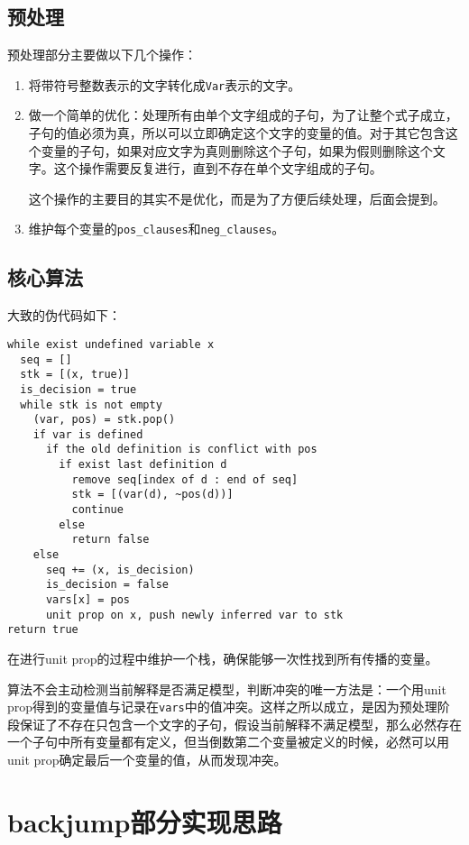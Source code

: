 \documentclass[12pt, UTF8]{article}
\begin{document}
\subsection{预处理}

预处理部分主要做以下几个操作：

\begin{enumerate}
  \item
    将带符号整数表示的文字转化成\lstinline|Var|表示的文字。
  \item
    做一个简单的优化：处理所有由单个文字组成的子句，为了让整个式子成立，子句的值必须为真，所以可以立即确定这个文字的变量的值。对于其它包含这个变量的子句，如果对应文字为真则删除这个子句，如果为假则删除这个文字。这个操作需要反复进行，直到不存在单个文字组成的子句。
    
    这个操作的主要目的其实不是优化，而是为了方便后续处理，后面会提到。
  \item
    维护每个变量的\lstinline|pos_clauses|和\lstinline|neg_clauses|。
\end{enumerate}

\subsection{核心算法}

大致的伪代码如下：

\begin{lstlisting}
while exist undefined variable x
  seq = []
  stk = [(x, true)]
  is_decision = true
  while stk is not empty
    (var, pos) = stk.pop()
    if var is defined
      if the old definition is conflict with pos
        if exist last definition d
          remove seq[index of d : end of seq]
          stk = [(var(d), ~pos(d))] 
          continue
        else
          return false
    else
      seq += (x, is_decision)
      is_decision = false
      vars[x] = pos
      unit prop on x, push newly inferred var to stk
return true
\end{lstlisting}

在进行unit prop的过程中维护一个栈，确保能够一次性找到所有传播的变量。

算法不会主动检测当前解释是否满足模型，判断冲突的唯一方法是：一个用unit prop得到的变量值与记录在\lstinline|vars|中的值冲突。这样之所以成立，是因为预处理阶段保证了不存在只包含一个文字的子句，假设当前解释不满足模型，那么必然存在一个子句中所有变量都有定义，但当倒数第二个变量被定义的时候，必然可以用unit prop确定最后一个变量的值，从而发现冲突。

\section{backjump部分实现思路}
\end{document}
